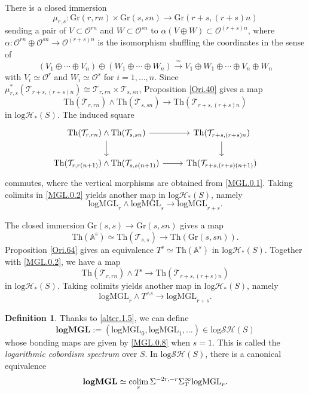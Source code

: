 \documentclass[11pt, a4paper]{amsart}
\theoremstyle{definition}
\newtheorem{df}[thm]{Definition}
\numberwithin{equation}{subsection}
\newcommand{\A}{\mathbb{A}}
\newcommand{\colimit}{\mathop{\rm colim}}
\newcommand{\Gr}{{\mathrm{Gr}}}
\newcommand{\Thom}{\mathrm{Th}}
\newcommand{\logMGL}{{\mathrm{logMGL}}}
\newcommand{\spectlogMGL}{{\mathbf{logMGL}}}
\newcommand{\cO}{\mathcal{O}}
\newcommand{\cT}{\mathcal{T}}
\newcommand{\inflogH}{\mathrm{log}\mathcal{H}}
\newcommand{\inflogSH}{\mathrm{log}\mathcal{SH}}
\begin{document}
There is a closed immersion
\begin{equation}
\label{MGL.0.11}
\mu_{r,s}
\colon
\Gr(r,rn) \times \Gr(s,sn)
\to
\Gr(r+s,(r+s)n)
\end{equation}
sending a pair of $V\subset \cO^{rn}$ and $W\subset \cO^{sn}$ to $\alpha(V\oplus W)\subset \cO^{(r+s)n}$,
where $\alpha\colon \cO^{rn}\oplus \cO^{sn}\to \cO^{(r+s)n}$ is the isomorphism shuffling the coordinates
in the sense of
\[
(V_1\oplus \cdots \oplus V_n) \oplus (W_1\oplus \cdots \oplus W_n)
\xrightarrow{\simeq}
V_1\oplus W_1\oplus \cdots \oplus V_n \oplus W_n
\]
with $V_i\simeq \cO^r$ and $W_i\simeq \cO^s$ for $i=1,\ldots,n$.
Since $\mu_{r,s}^*(\cT_{r+s,(r+s)n})\cong \cT_{r,rn}\times \cT_{s,sn}$, Proposition \ref{Ori.40} gives a map
\begin{equation}
\label{MGL.0.2}
\Thom(\cT_{r,rn})\wedge \Thom(\cT_{s,sn}) \to \Thom(\cT_{r+s,(r+s)n})
\end{equation}
in $\inflogH_{\ast}(S)$.
The induced square
\[
\begin{tikzcd}
\Thom(\cT_{r,rn})\wedge \Thom(\cT_{s,sn}) 
\ar[d]\ar[r]&
\Thom(\cT_{r+s,(r+s)n})\ar[d]
\\
\Thom(\cT_{r,r(n+1)})\wedge \Thom(\cT_{s,s(n+1)}) 
\ar[r]&
\Thom(\cT_{r+s,(r+s)(n+1)})
\end{tikzcd}
\]
commutes,
where the vertical morphisms are obtained from \eqref{MGL.0.1}.
Taking colimits in \eqref{MGL.0.2} yields another map in $\inflogH_{\ast}(S)$, 
namely
\begin{equation}
\label{MGL.0.7}
\logMGL_r\wedge \logMGL_s \to \logMGL_{r+s}.
\end{equation}

The closed immersion $\Gr(s,s)\to \Gr(s,sn)$ gives a map
\[
\Thom(\A^s)\simeq \Thom(\cT_{s,s}) \to \Thom(\Gr(s,sn)).
\]
Proposition \ref{Ori.64} gives an equivalence $T^s\simeq \Thom(\A^s)$ in $\inflogH_{\ast}(S)$.
Together with \eqref{MGL.0.2}, we have a map
\[
\Thom(\cT_{r,rn}) \wedge T^s
\to
\Thom(\cT_{r+s,(r+s)n})
\]
in $\inflogH_{\ast}(S)$.
Taking colimits yields another map in $\inflogH_{\ast}(S)$, 
namely
\begin{equation}
\label{MGL.0.8}
\logMGL_r\wedge T^{\wedge s}\to \logMGL_{r+s}.
\end{equation}

\begin{df}
Thanks to \eqref{alter.1.5}, we can define \index[notation]{logMGLspect @ $\spectlogMGL$}
\[
\spectlogMGL:=(\logMGL_0,\logMGL_1,\ldots)\in \inflogSH(S)
\]
whose bonding maps are given by \eqref{MGL.0.8} when $s=1$.
This is called the \emph{logarithmic cobordism spectrum} over $S$.
In $\inflogSH(S)$, there is a canonical equivalence
\begin{equation}
\label{MGL.1.6}
\spectlogMGL
\simeq
\colimit_r \Sigma^{-2r,-r}\Sigma_T^\infty\logMGL_r.
\end{equation}
\end{df}
\end{document}
